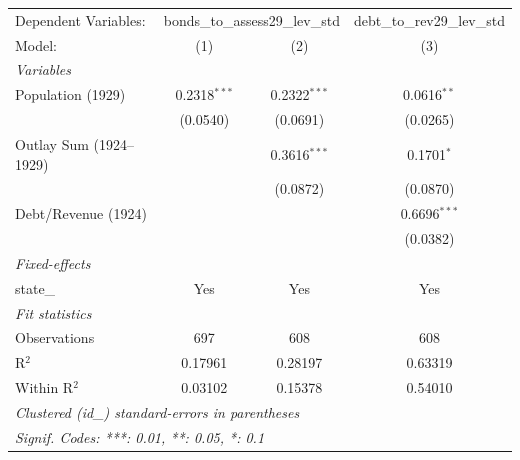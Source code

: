
\begingroup
\centering
\begin{tabular}{lccc}
   \tabularnewline \midrule \midrule
   Dependent Variables: & \multicolumn{2}{c}{bonds\_to\_assess29\_lev\_std} & debt\_to\_rev29\_lev\_std\\
   Model:                 & (1)            & (2)            & (3)\\  
   \midrule
   \emph{Variables}\\
   Population (1929)      & 0.2318$^{***}$ & 0.2322$^{***}$ & 0.0616$^{**}$\\   
                          & (0.0540)       & (0.0691)       & (0.0265)\\   
   Outlay Sum (1924–1929) &                & 0.3616$^{***}$ & 0.1701$^{*}$\\   
                          &                & (0.0872)       & (0.0870)\\   
   Debt/Revenue (1924)    &                &                & 0.6696$^{***}$\\   
                          &                &                & (0.0382)\\   
   \midrule
   \emph{Fixed-effects}\\
   state\_                & Yes            & Yes            & Yes\\  
   \midrule
   \emph{Fit statistics}\\
   Observations           & 697            & 608            & 608\\  
   R$^2$                  & 0.17961        & 0.28197        & 0.63319\\  
   Within R$^2$           & 0.03102        & 0.15378        & 0.54010\\  
   \midrule \midrule
   \multicolumn{4}{l}{\emph{Clustered (id\_) standard-errors in parentheses}}\\
   \multicolumn{4}{l}{\emph{Signif. Codes: ***: 0.01, **: 0.05, *: 0.1}}\\
\end{tabular}
\par\endgroup


